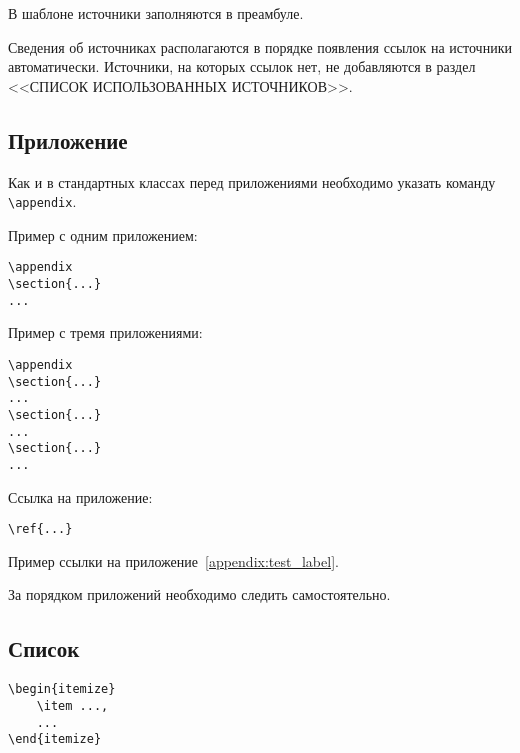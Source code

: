 \documentclass[14pt, a4paper, titlepage]{extarticle}
\renewcommand{\thesection}{\Asbuk{section}}
\let\oldsec\section
\renewcommand{\section}{
        \clearpage
        \phantomsection
        \refstepcounter{section}
        \addcontentsline{toc}{section}{\appendixname~\thesection}
        \oldsec*} %
\begin{document}
В шаблоне источники заполняются в преамбуле.

Сведения об источниках располагаются в порядке появления ссылок на источники автоматически. Источники, на которых ссылок нет, не добавляются в раздел \uppercase{<<Список использованных источников>>}.

\subsection{Приложение}

Как и в стандартных классах перед приложениями необходимо указать команду \verb"\appendix".

Пример с одним приложением:
\begin{verbatim}
\appendix
\section{...}
...
\end{verbatim}

Пример с тремя приложениями:
\begin{verbatim}
\appendix
\section{...}
...
\section{...}
...
\section{...}
...
\end{verbatim}

Ссылка на приложение:
\begin{verbatim}
\ref{...}
\end{verbatim}

Пример ссылки на приложение~\ref{appendix:test_label}.

За порядком приложений необходимо следить самостоятельно.

\subsection{Список}

\begin{verbatim}
\begin{itemize}
    \item ...,
    ...
\end{itemize}
\end{verbatim}
\end{document}
